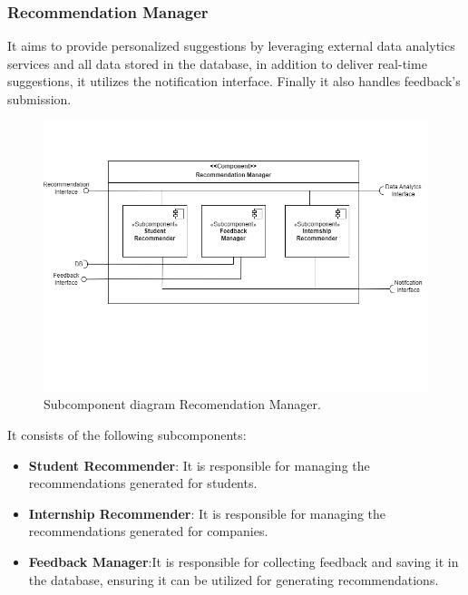 \subsubsection{Recommendation Manager} It aims to provide personalized suggestions by leveraging external data analytics services and all data stored in the database, in addition to deliver real-time suggestions, it utilizes the notification interface. Finally it also handles feedback's submission.
 \begin{figure}[htbp]
    \centering
    \includegraphics[width=\linewidth]{DD/Images/Comp&Sub/ReccomandationManager.png}
    \caption{Subcomponent diagram Recomendation Manager.}
    \label{fig:reccomendation_manager}
    \end{figure}

    It consists of the following subcomponents:
\begin{itemize}
    \item  \textbf{Student Recommender}: It is responsible for managing the recommendations generated for students.
    \item  \textbf{Internship Recommender}: It is responsible for managing the recommendations generated for companies.
    \item  \textbf{Feedback Manager}:It is responsible for collecting feedback and saving it in the database, ensuring it can be utilized for generating recommendations.
    \end{itemize}
    
 \clearpage %
